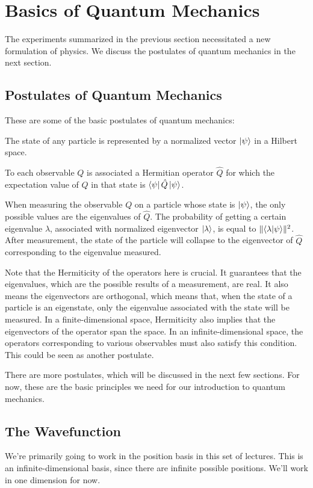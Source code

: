 \section{Basics of Quantum Mechanics}
The experiments summarized in the previous section necessitated a new formulation of physics. We discuss the postulates of quantum mechanics in the next section. 
\subsection{Postulates of Quantum Mechanics}
These are some of the basic postulates of quantum mechanics:
\begin{postulate}
\label{post1}
The state of any particle is represented by a normalized vector $\left| \psi \right\rangle$ in a Hilbert space. 
\end{postulate}
\begin{postulate}
\label{post2}
To each observable $Q$ is associated a Hermitian operator $\hat{Q}$ for which the expectation value of $Q$ in that state is $\left\langle \psi \right|\hat{Q}\left| \psi \right\rangle$.
\end{postulate}
\begin{postulate}
\label{post3}
When measuring the observable $Q$ on a particle whose state is $\left| \psi \right\rangle$, the only possible values are the eigenvalues of $\hat{Q}$. The probability of getting a certain eigenvalue $\lambda$, associated with normalized eigenvector $\left| \lambda \right\rangle$, is equal to $\lVert\left\langle \lambda \middle| \psi \right\rangle\rVert^2$. After measurement, the state of the particle will collapse to the eigenvector of $\hat{Q}$ corresponding to the eigenvalue measured.
\end{postulate}
Note that the Hermiticity of the operators here is crucial. It guarantees that the eigenvalues, which are the possible results of a measurement, are real. It also means the eigenvectors are orthogonal, which means that, when the state of a particle is an eigenstate, only the eigenvalue associated with the state will be measured. In a finite-dimensional space, Hermiticity also implies that the eigenvectors of the operator span the  space. In an infinite-dimensional space, the operators corresponding to various observables must also satisfy this condition. This could be seen as another postulate. 

There are more postulates, which will be discussed in the next few sections. For now, these are the basic principles we need for our introduction to quantum mechanics. 
\subsection{The Wavefunction}
We're primarily going to work in the position basis in this set of lectures. This is an infinite-dimensional basis, since there are infinite possible positions. We'll work in one dimension for now.

